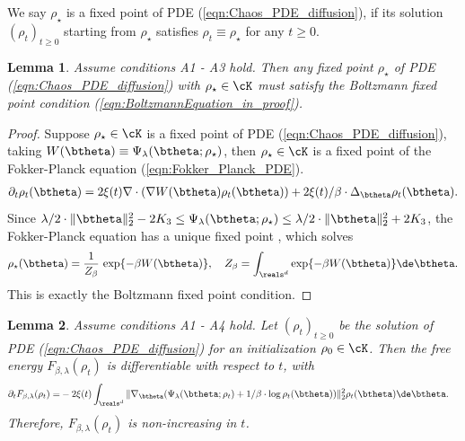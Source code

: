 \documentclass[11pt]{article}
\newtheorem{lemma}{Lemma}
\begin{document}
We say $\rho_\star$ is a fixed point of PDE (\ref{eqn:Chaos_PDE_diffusion}), if its solution $(\rho_t)_{t \ge 0}$ starting from $\rho_\star$ satisfies $\rho_t \equiv \rho_\star$ for any $t \ge 0$. 

\begin{lemma}\label{lem:Fixed_point_PDE_Boltzman}
Assume conditions {\sf A1} - {\sf A3} hold. Then any fixed point  $\rho_\star$ of PDE (\ref{eqn:Chaos_PDE_diffusion}) with $\rho_\star \in \cK$ must satisfy the Boltzmann fixed point condition (\ref{eqn:BoltzmannEquation_in_proof}). 
\end{lemma}


\begin{proof}
Suppose $\rho_\star \in \cK$ is a fixed point of PDE (\ref{eqn:Chaos_PDE_diffusion}), taking $W(\btheta) \equiv \Psi_\lambda(\btheta;\rho_\star)$, then $\rho_\star \in \cK$ is a fixed point of the Fokker-Planck equation (\ref{eqn:Fokker_Planck_PDE}). 
\begin{align}\label{eqn:Fokker_Planck_PDE}
\partial_t \rho_t(\btheta) = 2 \xi(t) \nabla \cdot (\nabla W(\btheta) \rho_t(\btheta)) + 2\xi(t)/\beta \cdot \Delta_\btheta \rho_t(\btheta). 
\end{align}
Since $\lambda/2 \cdot \| \btheta \|_2^2 - 2K_3 \le \Psi_\lambda(\btheta;\rho_\star) \le \lambda/2 \cdot \| \btheta \|_2^2 + 2K_3$, the  
Fokker-Planck equation has a unique fixed point  \cite{markowich2000trend}, which solves
\[
\begin{aligned}
\rho_\star(\btheta) = \frac{1}{Z_\beta} \, \exp\{ - \beta W(\btheta)\}, ~~~ Z_\beta = \int_{\reals^d} \exp\{ - \beta W(\btheta) \} \de \btheta. 
\end{aligned}
\]
This is exactly the Boltzmann fixed point condition.

\end{proof}



\begin{lemma}\label{lem:F_non_increasing}
Assume conditions {\sf A1} - {\sf A4} hold. Let $(\rho_t)_{t\ge 0}$ be the solution  of PDE (\ref{eqn:Chaos_PDE_diffusion}) for an initialization $\rho_0 \in \cK$. Then the free energy $F_{\beta, \lambda}(\rho_t)$ is differentiable with respect to $t$, with
\begin{align}\label{eqn:F_non_increasing}
\partial_t F_{\beta, \lambda}(\rho_t) =& - 2 \xi(t) \int_{\reals^d} \| \nabla_\btheta (\Psi_\lambda(\btheta; \rho_t) + 1/\beta \cdot \log \rho_t(\btheta)) \|_2^2 \rho_t(\btheta) \de \btheta.
\end{align}
Therefore, $F_{\beta, \lambda}(\rho_t)$ is non-increasing in $t$. 
\end{lemma}
\end{document}
